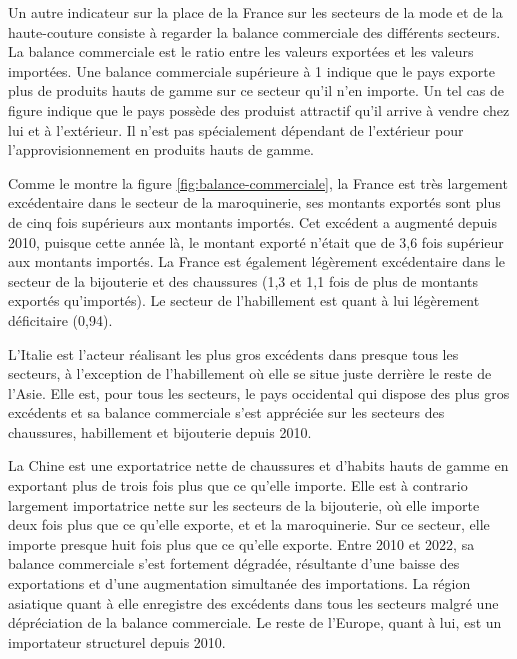 \documentclass[french,10pt,a4paper]{article}
\begin{document}
Un autre indicateur sur la place de la France sur les secteurs de la mode et de la haute-couture consiste à regarder la balance commerciale des différents secteurs. La balance commerciale est le ratio entre les valeurs exportées et les valeurs importées. Une balance commerciale supérieure à 1 indique que le pays exporte plus de produits hauts de gamme sur ce secteur qu'il n'en importe.  Un tel cas de figure indique que le pays possède des produist attractif qu'il arrive à vendre chez lui et à l'extérieur. Il n'est pas spécialement dépendant de l'extérieur pour l'approvisionnement en produits hauts de gamme.

Comme le montre la figure \ref{fig:balance-commerciale}, la France est très largement excédentaire dans le secteur de la maroquinerie, ses montants exportés sont plus de cinq fois supérieurs aux montants importés. Cet excédent a augmenté depuis 2010, puisque cette année là, le montant exporté n'était que de 3,6 fois supérieur aux montants importés. La France est également légèrement excédentaire dans le secteur de la bijouterie et des chaussures (1,3 et 1,1 fois de plus de montants exportés qu'importés). Le secteur de l'habillement est quant à lui légèrement déficitaire (0,94).

L'Italie est l'acteur réalisant les plus gros excédents dans presque tous les secteurs, à l'exception de l'habillement où elle se situe juste derrière le reste de l'Asie. Elle est, pour tous les secteurs, le pays occidental qui dispose des plus gros excédents et sa balance commerciale s'est appréciée sur les secteurs des chaussures, habillement et bijouterie depuis 2010.

La Chine est une exportatrice nette de chaussures et d'habits hauts de gamme en exportant plus de trois fois plus que ce qu'elle importe. Elle est à contrario largement importatrice nette sur les secteurs de la bijouterie, où elle importe deux fois plus que ce qu'elle exporte, et et la maroquinerie. Sur ce secteur, elle importe presque huit fois plus que ce qu'elle exporte. Entre 2010 et 2022, sa balance commerciale s'est fortement dégradée, résultante d'une baisse des exportations et d'une augmentation simultanée des importations. La région asiatique quant à elle enregistre des excédents dans tous les secteurs malgré une dépréciation de la balance commerciale. Le reste de l'Europe, quant à lui, est un importateur structurel depuis 2010. 
\end{document}

